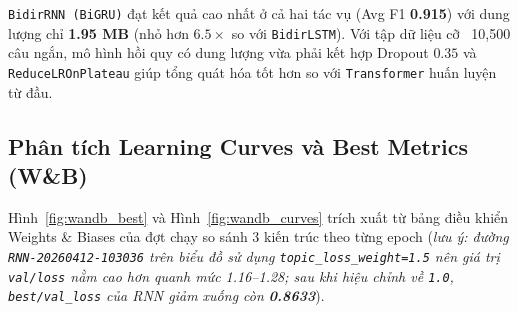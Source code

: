 \documentclass[a4paper,12pt]{article}
\begin{document}
\begin{table}[H]
\centering
\caption{So sánh hiệu năng tổng quan và kích thước checkpoint trên tập Test ($N = 2{,}884$).}
\label{tab:overall}
\small
\renewcommand{\arraystretch}{1.35}
\setlength{\tabcolsep}{9pt}
\end{table}

\begin{table}[H]
\centering
\caption{Chỉ số F1-score chi tiết theo từng lớp trên tập Test.}
\label{tab:perclass}
\small
\renewcommand{\arraystretch}{1.35}
\setlength{\tabcolsep}{9pt}
\end{table}

\texttt{BidirRNN (BiGRU)} đạt kết quả cao nhất ở cả hai tác vụ (Avg F1 \textbf{0.915}) với dung lượng chỉ \textbf{1.95 MB} (nhỏ hơn $6.5\times$ so với \texttt{BidirLSTM}). Với tập dữ liệu cỡ ~10,500 câu ngắn, mô hình hồi quy có dung lượng vừa phải kết hợp Dropout $0.35$ và \texttt{ReduceLROnPlateau} giúp tổng quát hóa tốt hơn so với \texttt{Transformer} huấn luyện từ đầu.

\subsection{Phân tích Learning Curves và Best Metrics (W\&B)}
Hình~\ref{fig:wandb_best} và Hình~\ref{fig:wandb_curves} trích xuất từ bảng điều khiển Weights \& Biases của đợt chạy so sánh 3 kiến trúc theo từng epoch (\textit{lưu ý: đường \texttt{RNN-20260412-103036} trên biểu đồ sử dụng \texttt{topic\_loss\_weight=1.5} nên giá trị \texttt{val/loss} nằm cao hơn quanh mức 1.16--1.28; sau khi hiệu chỉnh về \texttt{1.0}, \texttt{best/val\_loss} của RNN giảm xuống còn \textbf{0.8633}}).
\end{document}
